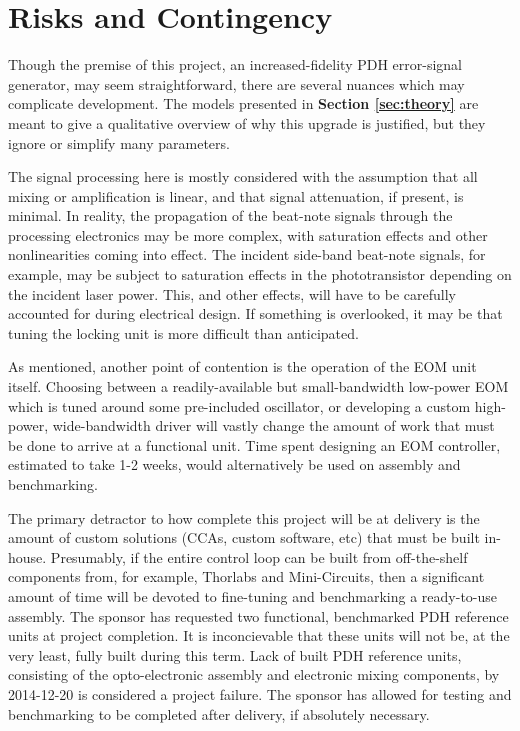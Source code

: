 \newpage
\section{Risks and Contingency}

Though the premise of this project, an increased-fidelity PDH error-signal
generator, may seem straightforward, there are several nuances which may
complicate development. The models presented in \textbf{Section
\ref{sec:theory}} are meant to give a qualitative overview of why this upgrade
is justified, but they ignore or simplify many parameters.

The signal processing here is mostly considered with the assumption that all
mixing or amplification is linear, and that signal attenuation, if present,
is minimal. In reality, the propagation of the beat-note signals through the
processing electronics may be more complex, with saturation effects and other
nonlinearities coming into effect. The incident side-band beat-note signals,
for example, may be subject to saturation effects in the phototransistor depending
on the incident laser power. This, and other effects, will have to be carefully
accounted for during electrical design. If something is overlooked, it may be that
tuning the locking unit is more difficult than anticipated.

As mentioned, another point of contention is the operation of the EOM unit itself.
Choosing between a readily-available but small-bandwidth low-power EOM which
is tuned around some pre-included oscillator, or developing a custom high-power,
wide-bandwidth driver will vastly change the amount of work that must be done to
arrive at a functional unit. Time spent designing an EOM controller, estimated
to take 1-2 weeks, would alternatively be used on assembly and benchmarking.

The primary detractor to how complete this project will be at delivery
is the amount of custom solutions (CCAs, custom software, etc) that must be
built in-house. Presumably, if the entire control loop can be built from
off-the-shelf components from, for example, Thorlabs and Mini-Circuits,
then a significant amount of time will be devoted to fine-tuning and
benchmarking a ready-to-use assembly. The sponsor has requested two functional, benchmarked PDH reference units at project completion. It is inconcievable that
these units will not be, at the very least, fully built during this term. Lack of
built PDH reference units, consisting of the opto-electronic assembly and electronic
mixing components, by 2014-12-20 is considered a project failure. The sponsor
has allowed for testing and benchmarking to be completed after delivery, if
absolutely necessary.